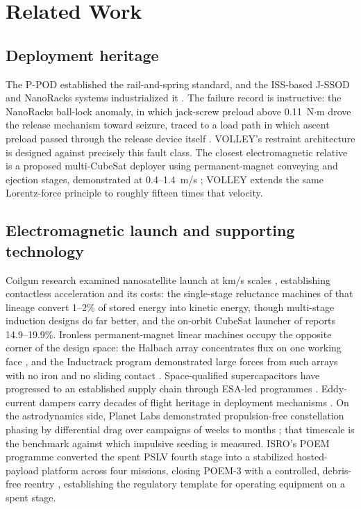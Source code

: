 \documentclass[conference]{IEEEtran}
\begin{document}
\section{Related Work}
\subsection{Deployment heritage}
The P-POD established the rail-and-spring standard, and the ISS-based J-SSOD and NanoRacks systems industrialized it \cite{jssod,soa}. The failure record is instructive: the NanoRacks ball-lock anomaly, in which jack-screw preload above 0.11~N$\cdot$m drove the release mechanism toward seizure, traced to a load path in which ascent preload passed through the release device itself \cite{lewis}. VOLLEY's restraint architecture is designed against precisely this fault class. The closest electromagnetic relative is a proposed multi-CubeSat deployer using permanent-magnet conveying and ejection stages, demonstrated at 0.4--1.4~m/s \cite{mdpi}; VOLLEY extends the same Lorentz-force principle to roughly fifteen times that velocity.

\subsection{Electromagnetic launch and supporting technology}
Coilgun research examined nanosatellite launch at km/s scales \cite{turman,kaye}, establishing contactless acceleration and its costs: the single-stage reluctance machines of that lineage convert 1--2\% of stored energy into kinetic energy, though multi-stage induction designs do far better, and the on-orbit CubeSat launcher of \cite{feng2025} reports 14.9--19.9\%. Ironless permanent-magnet linear machines occupy the opposite corner of the design space: the Halbach array concentrates flux on one working face \cite{halbach}, and the Inductrack program demonstrated large forces from such arrays with no iron and no sliding contact \cite{inductrack}. Space-qualified supercapacitors have progressed to an established supply chain through ESA-led programmes \cite{faure,espc}. Eddy-current dampers carry decades of flight heritage in deployment mechanisms \cite{eddy}. On the astrodynamics side, Planet Labs demonstrated propulsion-free constellation phasing by differential drag over campaigns of weeks to months \cite{foster,foster2}; that timescale is the benchmark against which impulsive seeding is measured. ISRO's POEM programme converted the spent PSLV fourth stage into a stabilized hosted-payload platform across four missions, closing POEM-3 with a controlled, debris-free reentry \cite{poem3,poem4}, establishing the regulatory template for operating equipment on a spent stage.
\end{document}
